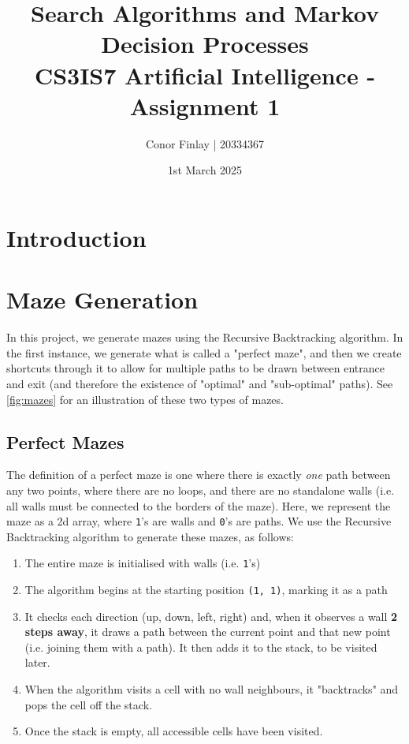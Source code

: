 \documentclass{article}
\title{Search Algorithms and Markov Decision Processes \\ CS3IS7 Artificial Intelligence - Assignment 1}
\author{Conor Finlay | 20334367}
\date{1st March 2025}
\begin{document}
\maketitle

\section{Introduction}

\section{Maze Generation}

In this project, we generate mazes using the Recursive Backtracking algorithm. In the first instance, we generate what is called a "perfect maze", and then we create shortcuts through it to allow for multiple paths to be drawn between entrance and exit (and therefore the existence of "optimal" and "sub-optimal" paths). See \autoref{fig:mazes} for an illustration of these two types of mazes.

\subsection{Perfect Mazes}

The definition of a perfect maze is one where there is exactly \textit{one} path between any two points, where there are no loops, and there are no standalone walls (i.e. all walls must be connected to the borders of the maze). Here, we represent the maze as a 2d array, where \texttt{1}'s are walls and \texttt{0}'s are paths. We use the Recursive Backtracking algorithm to generate these mazes, as follows:

\begin{enumerate}
    \item The entire maze is initialised with walls (i.e. \texttt{1}'s)
    \item The algorithm begins at the starting position \texttt{(1, 1)}, marking it as a path
    \item It checks each direction (up, down, left, right) and, when it observes a wall \textbf{2 steps away}, it draws a path between the current point and that new point (i.e. joining them with a path). It then adds it to the stack, to be visited later.
    \item When the algorithm visits a cell with no wall neighbours, it "backtracks" and pops the cell off the stack.
    \item Once the stack is empty, all accessible cells have been visited.
\end{enumerate}
\end{document}
